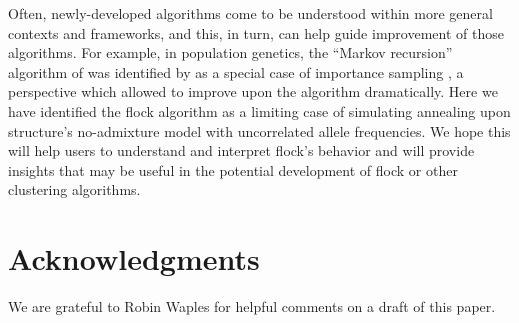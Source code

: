 Often, newly-developed algorithms come to be understood within more general contexts and 
frameworks, and this, in turn, can help guide improvement of those algorithms.  For example, in population
genetics, the ``Markov recursion'' algorithm of \citet{Gri&Tav1994-AI} was identified by \citet{Felsensteinetal1999} 
as a special case of importance sampling \citep{Ham&Han1964}, a perspective which allowed 
\citet{Ste&Don2000} to improve upon the algorithm dramatically.  Here we have identified the {\sc flock}
algorithm as a limiting case of simulating annealing upon {\sc structure}'s no-admixture model with uncorrelated
allele frequencies. We hope this will
help users to understand and interpret {\sc flock}'s behavior and will provide insights that may be useful 
in the potential development of {\sc flock} or other clustering algorithms.   


\section*{Acknowledgments}
We are grateful to Robin Waples for helpful comments on a draft of this paper.